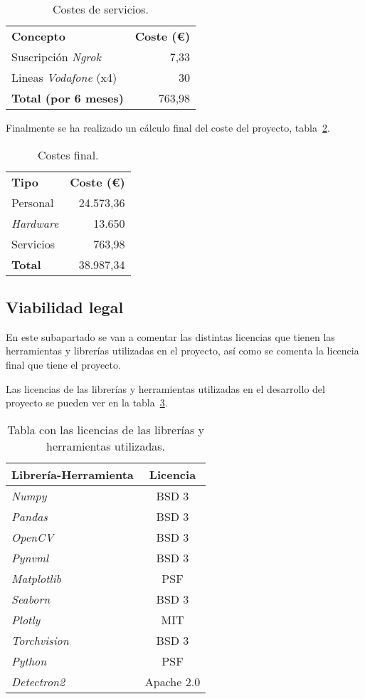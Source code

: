\begin{table}
	\centering
	\begin{tabular}[]{@{}l r@{}}
		\toprule
		\textbf{Concepto} & \textbf{Coste (\euro{})}\\
		\otoprule
		Suscripción \textit{Ngrok}  & 7,33 \\
		Lineas \textit{Vodafone} (x4) & 30 \\\hubu
		\textbf{Total (por 6 meses)} & 763,98\\
		\bottomrule
	\end{tabular}
	\caption{Costes de servicios.}
	\label{tab:costes_servicios}
\end{table}

Finalmente se ha realizado un cálculo final del coste del proyecto, tabla~\ref{tab:coste_final}.

\begin{table}
	\centering
	\begin{tabular}[]{@{}l r@{}}
		\toprule
		\textbf{Tipo} & \textbf{Coste (\euro{})}\\
		\otoprule
		Personal  & 24.573,36 \\
		\textit{Hardware}& 13.650 \\
		Servicios & 763,98\\\hubu
		\textbf{Total}&38.987,34\\
		\bottomrule
	\end{tabular}
	\caption{Costes final.}
	\label{tab:coste_final}
\end{table}

\subsection{Viabilidad legal}
En este subapartado se van a comentar las distintas licencias que tienen las herramientas y librerías utilizadas en el proyecto, así como se comenta la licencia final que tiene el proyecto.

Las licencias de las librerías y herramientas utilizadas en el desarrollo del proyecto se pueden ver en la tabla~\ref{tab:lic}.

\begin{table}[h]
	\centering
		\begin{tabular}{lc}
			\toprule
			\textbf{Librería-Herramienta}&\textbf{Licencia}\\
			\midrule
			\textit{Numpy} & BSD 3\\
			\textit{Pandas} & BSD 3\\
			\textit{OpenCV}& BSD 3\\
			\textit{Pynvml} & BSD 3\\
			\textit{Matplotlib} &  PSF\\
			\textit{Seaborn} & BSD 3\\
			\textit{Plotly} & MIT\\
			\textit{Torchvision} & BSD 3\\
			\textit{Python} & PSF\\
			\textit{Detectron2}& Apache 2.0\\
			\bottomrule
		\end{tabular}
	\caption{Tabla con las licencias de las librerías y herramientas utilizadas.}
	\label{tab:lic}
\end{table}

